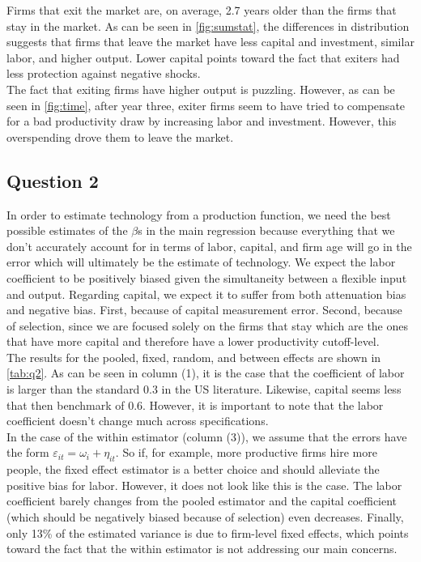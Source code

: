 \documentclass[11pt]{article}
\begin{document}
\newpage

Firms that exit the market are, on average, 2.7 years older than the firms that stay in the market. As can be seen in \autoref{fig:sumstat}, the differences in distribution suggests that firms that leave the market have less capital and investment, similar labor, and higher output. Lower capital points toward the fact that exiters had less protection against negative shocks. \\
The fact that exiting firms have higher output is puzzling. However, as can be seen in \autoref{fig:time}, after year three, exiter firms seem to have tried to compensate for a bad productivity draw by increasing labor and investment. However, this overspending drove them to leave the market.


\subsection*{Question 2} \label{q2}

In order to estimate technology from a production function, we need the best possible estimates of the $\beta$s in the main regression because everything that we don't accurately account for in terms of labor, capital, and firm age will go in the error which will ultimately be the estimate of technology. We expect the labor coefficient to be positively biased given the simultaneity between a flexible input and output. Regarding capital, we expect it to suffer from both attenuation bias and negative bias. First, because of capital measurement error. Second, because of selection, since we are focused solely on the firms that stay which are the ones that have more capital and therefore have a lower productivity cutoff-level.\\

The results for the pooled, fixed, random, and between effects are shown in \autoref{tab:q2}. As can be seen in column (1), it is the case that the coefficient of labor is larger than the standard 0.3 in the US literature. Likewise, capital seems less that then benchmark of 0.6. However, it is important to note that the labor coefficient doesn't change much across specifications. \\

In the case of the within estimator (column (3)), we assume that the errors have the form $\varepsilon_{it}=\omega_i+\eta_{it}$. So if, for example, more productive firms hire more people, the fixed effect estimator is a better choice and should alleviate the positive bias for labor. However, it does not look like this is the case. The labor coefficient barely changes from the pooled estimator and the capital coefficient (which should be negatively biased because of selection) even decreases. Finally, only 13\% of the estimated variance is due to firm-level fixed effects, which points toward the fact that the within estimator is not addressing our main concerns. \\
\end{document}
